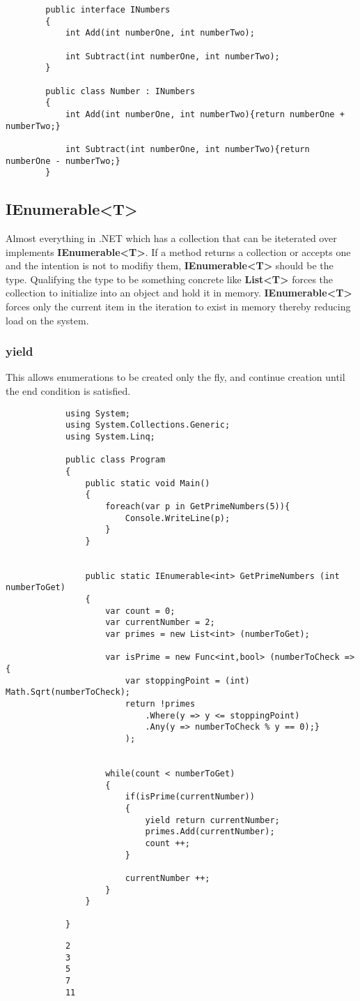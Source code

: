 \documentclass {amsart}
\begin{document}
	\begin{lstlisting}
		public interface INumbers
		{
			int Add(int numberOne, int numberTwo);

			int Subtract(int numberOne, int numberTwo);
		}

		public class Number : INumbers
		{
			int Add(int numberOne, int numberTwo){return numberOne + numberTwo;}

			int Subtract(int numberOne, int numberTwo){return numberOne - numberTwo;}
		}

	\end{lstlisting}


	\subsection{IEnumerable\textless T\textgreater}  Almost everything in .NET which has a collection that can be iteterated over implements {\bf IEnumerable\textless T\textgreater}.  If a method returns a collection or accepts one and the intention is not to modifiy them, {\bf IEnumerable\textless T\textgreater} should be the type.  Qualifying the type to be something concrete like {\bf List\textless T\textgreater} forces the collection to initialize into an object and hold it in memory.  {\bf IEnumerable\textless T\textgreater} forces only the current item in the iteration to exist in memory thereby reducing load on the system.  



		\subsubsection {yield}  This allows enumerations to be created only the fly, and continue creation until the end condition is satisfied.

		\begin{lstlisting}
			using System;
			using System.Collections.Generic;
			using System.Linq;

			public class Program
			{
				public static void Main()
				{
					foreach(var p in GetPrimeNumbers(5)){
						Console.WriteLine(p);	
					}
				}
				
				
				public static IEnumerable<int> GetPrimeNumbers (int numberToGet)
				{
					var count = 0;
					var currentNumber = 2;
					var primes = new List<int> (numberToGet); 

					var isPrime = new Func<int,bool> (numberToCheck => {
						var stoppingPoint = (int) Math.Sqrt(numberToCheck);
						return !primes
							.Where(y => y <= stoppingPoint)
							.Any(y => numberToCheck % y == 0);}
						); 		
					
					
					while(count < numberToGet)
					{
						if(isPrime(currentNumber))
						{
							yield return currentNumber;
							primes.Add(currentNumber);
							count ++;		   
						}
						
						currentNumber ++;
					}
				}
				
			}

		\end{lstlisting}
		\begin{verbatim}
			2
			3
			5
			7
			11
		\end{verbatim}
\end{document}
